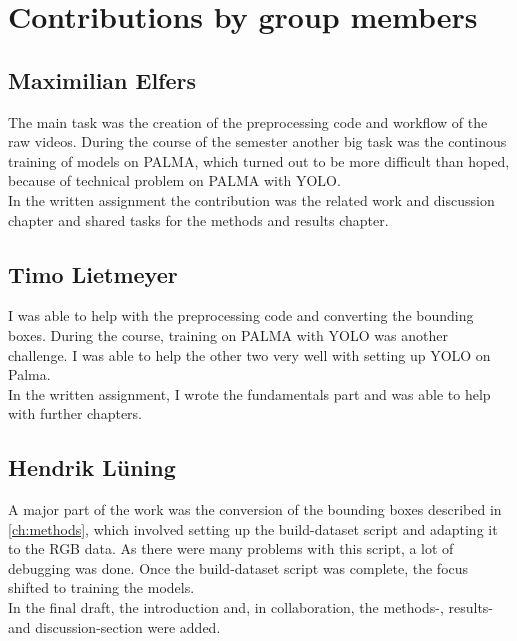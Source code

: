 \chapter{Contributions by group members}
\label{ch:contributions}


\section{Maximilian Elfers}

The main task was the creation of the preprocessing code and workflow of the raw videos. During the course of the semester another big task was the continous training of models on PALMA, which turned out to be more difficult than hoped, because of technical problem on PALMA with YOLO. \\
In the written assignment the contribution was the related work and discussion chapter and shared tasks for the methods and results chapter.

\section{Timo Lietmeyer}
I was able to help with the preprocessing code and converting the bounding boxes. During the course, training on PALMA with YOLO was another challenge. I was able to help the other two very well with setting up YOLO on Palma. \\ In the written assignment, I wrote the fundamentals part and was able to help with further chapters.

\section{Hendrik Lüning}
A major part of the work was the conversion of the bounding boxes described in \ref{ch:methods}, which involved setting up the build-dataset script and adapting it to the RGB data. As there were many problems with this script, a lot of debugging was done. Once the build-dataset script was complete, the focus shifted to training the models.\\
In the final draft, the introduction and, in collaboration, the methods-, results- and discussion-section were added.
